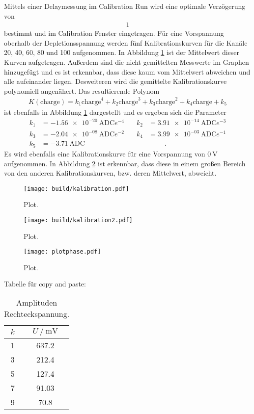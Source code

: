 Mittels einer Delaymessung im Calibration Run wird eine optimale Verzögerung von
\begin{align}
  1
\end{align}
bestimmt und im Calibration Fenster eingetragen. Für eine Vorspannung oberhalb der
Depletionsspannung werden fünf Kalibrationskurven für die Kanäle 20, 40, 60, 80 und 100 aufgenommen. In Abbildung \ref{fig:kalibration}
ist der Mittelwert dieser Kurven aufgetragen. Außerdem sind die nicht gemittelten
Messwerte im Graphen hinzugefügt und es ist erkennbar, dass diese kaum vom Mittelwert abweichen und
alle aufeinander liegen. Desweiteren wird die gemittelte Kalibrationskurve polynomiell angenähert.
Das resultierende Polynom
\begin{align}
  K(\text{charge}) = k_1 \text{charge}^4 + k_2 \text{charge}^3 + k_3 \text{charge}^2 + k_4 \text{charge} + k_5
\end{align}
ist ebenfalls in Abbildung \ref{fig:kalibration} dargestellt und es ergeben sich die Parameter
\begin{align*}
  k_1 &= \SI{-1.56e-20}{\text{ADC}e^{-4}} &\quad k_2 &= \SI{3.91e-14}{\text{ADC}e^{-3}} \\
  k_3 &= \SI{-2.04e-08}{\text{ADC}e^{-2}} &\quad k_4 &= \SI{3.99e-03}{\text{ADC}e^{-1}} \\
  k_5 &= \SI{-3.71}{\text{ADC}} &\quad \phantom{f}&\phantom{=10}.
\end{align*}
Es wird ebenfalls eine Kalibrationskurve für eine Vorspannung von $\SI{0}{\volt}$ aufgenommen. In Abbildung
\ref{fig:kalibration2} ist erkennbar, dass diese in einem großen Bereich von den anderen Kalibrationskurven,
bzw. deren Mittelwert, abweicht.

\begin{figure}
  \centering
  \texttt{[image: build/kalibration.pdf]}
  \caption{Plot.}
  \label{fig:kalibration}
\end{figure}

\begin{figure}
  \centering
  \texttt{[image: build/kalibration2.pdf]}
  \caption{Plot.}
  \label{fig:kalibration2}
\end{figure}

\begin{figure}
  \centering
  \texttt{[image: plotphase.pdf]}
  \caption{Plot.}
  \label{fig:plot}
\end{figure}

Tabelle für copy and paste:
\begin{table}[h]
  \centering
  \begin{tabular}{S S}
    \toprule
    {$k$} & {$U\:/\:\si{\milli\volt}$}\\
     & 637.2\\
    3 & 212.4\\
    5 & 127.4\\
    7 & 91.03\\
    9 & 70.8\\
    \bottomrule
  \end{tabular}
  \caption{Amplituden Rechteckspannung.}
  \label{tab:rechtampl}
\end{table}


